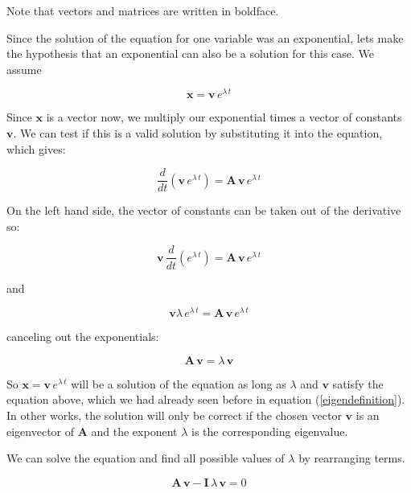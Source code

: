 \documentclass{tufte-book} %
\begin{document}
Note that vectors and matrices are written in boldface.

Since the solution of the equation for one variable was an exponential, lets make the hypothesis that an exponential can also be a solution for this case. We assume

\begin{equation}
	\mathbf{x}= \mathbf{v} \, e^{\lambda \, t} \nonumber
\end{equation}

Since $\mathbf{x}$ is a vector now, we multiply our exponential times a  vector of constants $\mathbf{v}$. We can test if this is a valid solution by substituting it into the equation, which gives:

\begin{equation}
	\frac{d}{dt} \left( \mathbf{v} \, e^{\lambda \, t} \right)  = \mathbf{A} \, \mathbf{v} \, e^{\lambda \, t}  \nonumber
\end{equation}

On the left hand side, the vector of  constants can be taken out of the derivative so:

\begin{equation}
	\mathbf{v} \, \frac{d}{dt} \left(  e^{\lambda \, t} \right)  = \mathbf{A} \, \mathbf{v} \, e^{\lambda \, t}  \nonumber
\end{equation}
 
 and
 
 \begin{equation}
 	\mathbf{v}   \lambda \, e^{\lambda \, t}   = \mathbf{A} \, \mathbf{v} \, e^{\lambda \, t} \nonumber
 \end{equation}
 
canceling out the exponentials:

\begin{equation}
\mathbf{A} \, \mathbf{v}  = \lambda  \,	\mathbf{v}   
\end{equation}
 
So $\mathbf{x}=\mathbf{v} \, e^{\lambda \, t}$ will be a solution of the equation as long as $\lambda$ and $\mathbf{v}$ satisfy the equation above, which we had already seen before in equation (\ref{eigendefinition}). In other works, the solution will only be correct if the chosen vector $\mathbf{v}$ is an eigenvector of $\mathbf{A}$ and the exponent $\lambda$ is the corresponding eigenvalue.

We can solve the equation and find all possible values of $\lambda$ by rearranging terms.

\begin{equation}
	\mathbf{A} \, \mathbf{v}  - \mathbf{I} \, \lambda  \,	\mathbf{v}   = 0 \nonumber
\end{equation}
\end{document}
